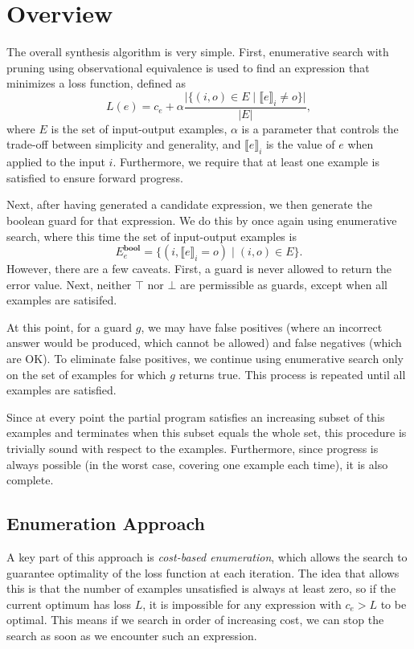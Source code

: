 \documentclass{article}
\newcommand*{\Tbool}{\textbf{bool}}
\begin{document}
\section{Overview}
The overall synthesis algorithm is very simple.
First, enumerative search with pruning using observational equivalence is used to find an expression that minimizes
a loss function, defined as
\[ L(e) = c_e + \alpha \frac{\lvert\{ (i, o) \in E \mid \llbracket e\rrbracket_i \ne o \}\rvert}{\lvert E\rvert}, \]
where $E$ is the set of input-output examples, $\alpha$ is a parameter
that controls the trade-off between simplicity and generality,
and $\llbracket e\rrbracket_i$ is the value of $e$ when applied to the input $i$.
Furthermore, we require that at least one example is satisfied to ensure forward progress.

Next, after having generated a candidate expression, we then generate
the boolean guard for that expression. We do this by once again using
enumerative search, where this time the set of input-output examples is
\[ E^{\Tbool}_e = \{ (i, \llbracket e\rrbracket_i = o) \mid (i, o) \in E \}. \]
However, there are a few caveats. First, a guard is never allowed to return the error value.
Next, neither $\top$ nor $\bot$ are permissible as guards, except
when all examples are satisifed.

At this point, for a guard $g$,
we may have false positives (where an incorrect answer would be produced, which cannot be allowed)
and false negatives (which are OK). To eliminate false positives,
we continue using enumerative search only on the set of examples for
which $g$ returns true. This process is repeated until all examples
are satisfied.

Since at every point the partial program satisfies an increasing subset
of this examples and terminates when this subset equals the whole set,
this procedure is trivially sound with respect to the examples.
Furthermore, since progress is always possible (in the worst case,
covering one example each time), it is also complete.

\subsection{Enumeration Approach}
A key part of this approach is \emph{cost-based enumeration},
which allows the search to guarantee optimality of the loss function at each iteration.
The idea that allows this is that the number of examples unsatisfied
is always at least zero, so if the current optimum has loss $L$,
it is impossible for any expression with $c_e > L$ to be optimal.
This means if we search in order of increasing cost,
we can stop the search as soon as we encounter such an expression.
\end{document}
